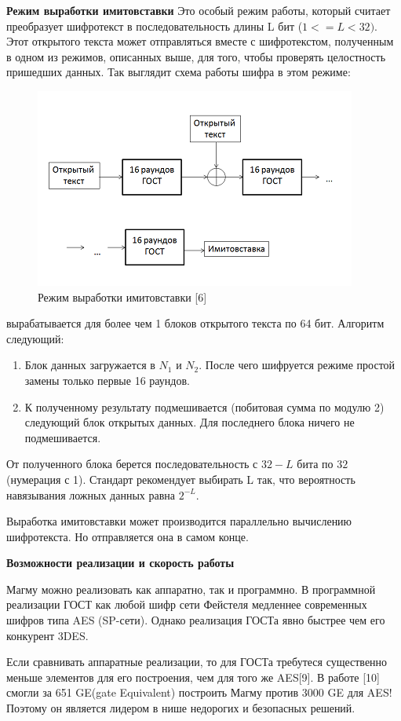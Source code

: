\documentclass[colorthm]{./civarticle}
\begin{document}
\textbf{Режим выработки имитовставки}
Это особый режим работы, который считает преобразует шифротекст в последовательность длины L бит ($1 <= L < 32)$. Этот \textquotedbl открытого текста может отправляться вместе с шифротекстом, полученным в одном из режимов, описанных выше, для того, чтобы проверять целостность пришедших данных. Так выглядит схема работы шифра в этом режиме:

\begin{figure}[H]
    \centering
    \includegraphics[width=0.25\linewidth]{Imitovstavka_GOST.png}
    \caption{Режим выработки имитовставки [6]}
    \label{fig:enter-label}
\end{figure}

\textquotedbl вырабатывается для более чем 1 блоков открытого текста по 64 бит. Алгоритм следующий:

\begin{enumerate}
    \item Блок данных загружается в $N_1$ и $N_2$. После чего шифруется режиме простой замены только первые 16 раундов.
    \item К полученному результату подмешивается (побитовая сумма по модулю 2) следующий блок открытых данных. Для последнего блока ничего не подмешивается.
\end{enumerate}

От полученного блока берется последовательность с $32-L$ бита по $32$ (нумерация с 1). Стандарт рекомендует выбирать L так, что вероятность навязывания ложных данных равна $2^{-L}$.

Выработка имитовставки может производится параллельно вычислению шифротекста. Но отправляется она в самом конце.

\textbf{Возможности реализации и скорость работы}

Магму можно реализовать как аппаратно, так и программно. В программной реализации ГОСТ как любой шифр сети Фейстеля медленнее современных шифров типа AES (SP-сети). Однако реализация ГОСТа явно быстрее чем его конкурент 3DES. 

Если сравнивать аппаратные реализации, то для ГОСТа требутеся существенно меньше элементов для его построения, чем для того же AES[9]. В работе [10] смогли за 651 GE(gate Equivalent) построить Магму против 3000 GE для AES!Поэтому он является лидером в нише недорогих и безопасных решений. 
\end{document}
